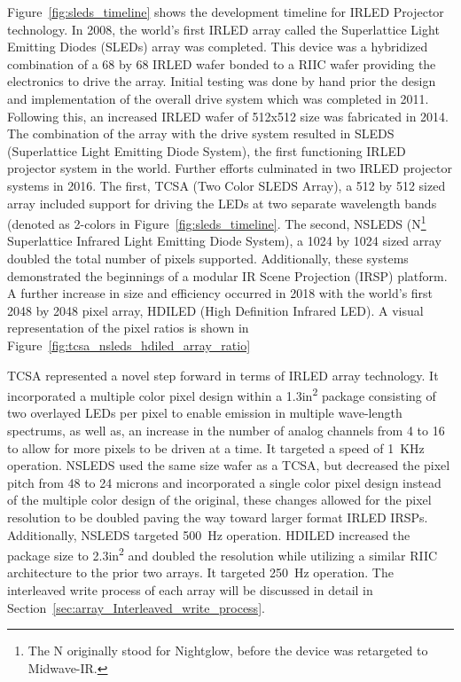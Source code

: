     Figure~\ref{fig:sleds_timeline} shows the development timeline for IRLED Projector technology. In 2008, the world's first IRLED array called the Superlattice Light Emitting Diodes (SLEDs) array was completed\cite{ahmed1}. This device was a hybridized combination of a 68 by 68 IRLED wafer bonded to a RIIC wafer\cite{das2} providing the electronics to drive the array. Initial testing was done by hand prior the design and implementation of the overall drive system which was completed in 2011. Following this, an increased IRLED wafer of 512x512 size was fabricated in 2014\cite{norton1}. The combination of the array with the drive system resulted in SLEDS (Superlattice Light Emitting Diode System), the first functioning IRLED projector system in the world. Further efforts culminated in two IRLED projector systems in 2016. The first, TCSA (Two Color SLEDS Array), a 512 by 512 sized array\cite{McGeeEtAl2015, ejzak1, ejzak2, EjzakEtAl2016, RickerEtAl2017} included support for driving the LEDs at two separate wavelength bands (denoted as 2-colors in Figure~\ref{fig:sleds_timeline}. The second, NSLEDS (N\footnote{The N originally stood for Nightglow, before the device was retargeted to Midwave-IR.} Superlattice Infrared Light Emitting Diode System), a 1024 by 1024 sized array\cite{benedict1} doubled the total number of pixels supported. Additionally, these systems demonstrated the beginnings of a modular IR Scene Projection (IRSP) platform\cite{BrowningEtAl2019}. A further increase in size and efficiency occurred in 2018 with the world's first 2048 by 2048 pixel array, HDILED (High Definition Infrared LED). A visual representation of the pixel ratios is shown in Figure~\ref{fig:tcsa_nsleds_hdiled_array_ratio}

    TCSA represented a novel step forward in terms of IRLED array technology. It incorporated a multiple color pixel design within a 1.3in\textsuperscript{2} package consisting of two overlayed LEDs per pixel to enable emission in multiple wave-length spectrums, as well as, an increase in the number of analog channels from 4 to 16 to allow for more pixels to be driven at a time. It targeted a speed of \mbox{1 KHz} operation. NSLEDS used the same size wafer as a TCSA, but decreased the pixel pitch from 48 to 24 microns and incorporated a single color pixel design instead of the multiple color design of the original, these changes allowed for the pixel resolution to be doubled paving the way toward larger format IRLED IRSPs. Additionally, NSLEDS targeted \mbox{500 Hz} operation. HDILED increased the package size to 2.3in\textsuperscript{2} and doubled the resolution while utilizing a similar RIIC architecture to the prior two arrays. It targeted \mbox{250 Hz} operation. The interleaved write process of each array will be discussed in detail in Section~\ref{sec:array_Interleaved_write_process}.

